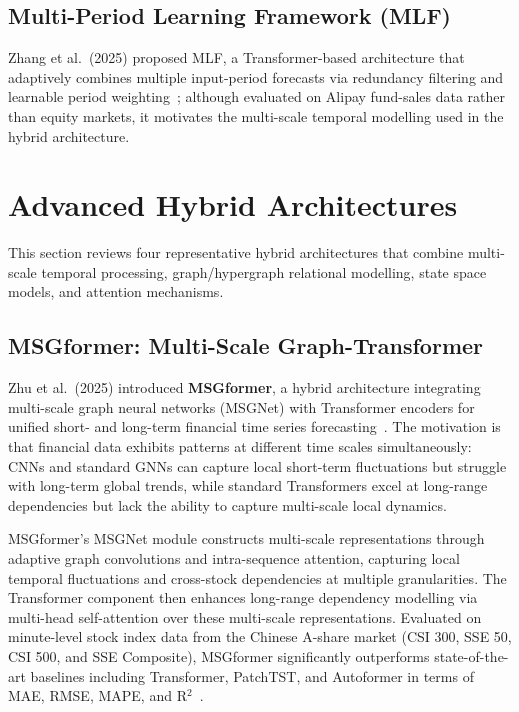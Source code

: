 \documentclass[a4paper,11pt]{report}
\begin{document}
\subsection{Multi-Period Learning Framework (MLF)}

Zhang et al.\ (2025) proposed MLF, a Transformer-based architecture that adaptively combines multiple input-period forecasts via redundancy filtering and learnable period weighting~\cite{zhang2025mlf}; although evaluated on Alipay fund-sales data rather than equity markets, it motivates the multi-scale temporal modelling used in the hybrid architecture.

\section{Advanced Hybrid Architectures}
\label{sec:hybrid}

This section reviews four representative hybrid architectures that combine multi-scale temporal processing, graph/hypergraph relational modelling, state space models, and attention mechanisms.

\subsection{MSGformer: Multi-Scale Graph-Transformer}

Zhu et al.\ (2025) introduced \textbf{MSGformer}, a hybrid architecture integrating multi-scale graph neural networks (MSGNet) with Transformer encoders for unified short- and long-term financial time series forecasting~\cite{zhu2025msgformer}. The motivation is that financial data exhibits patterns at different time scales simultaneously: CNNs and standard GNNs can capture local short-term fluctuations but struggle with long-term global trends, while standard Transformers excel at long-range dependencies but lack the ability to capture multi-scale local dynamics.

MSGformer's MSGNet module constructs multi-scale representations through adaptive graph convolutions and intra-sequence attention, capturing local temporal fluctuations and cross-stock dependencies at multiple granularities. The Transformer component then enhances long-range dependency modelling via multi-head self-attention over these multi-scale representations. Evaluated on minute-level stock index data from the Chinese A-share market (CSI 300, SSE 50, CSI 500, and SSE Composite), MSGformer significantly outperforms state-of-the-art baselines including Transformer, PatchTST, and Autoformer in terms of MAE, RMSE, MAPE, and R$^2$~\cite{zhu2025msgformer}.
\end{document}
